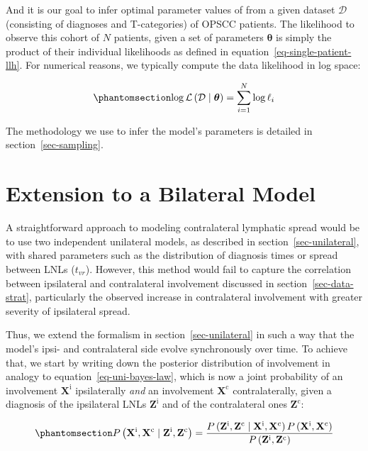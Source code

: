 \documentclass[
  sn-mathphys-num,
]{sn-jnl}
\begin{document}
And it is our goal to infer optimal parameter values of from a given
dataset \(\mathcal{D}\) (consisting of diagnoses and T-categories) of
OPSCC patients. The likelihood to observe this cohort of \(N\) patients,
given a set of parameters \(\boldsymbol{\theta}\) is simply the product
of their individual likelihoods as defined in
equation~\ref{eq-single-patient-llh}. For numerical reasons, we
typically compute the data likelihood in log space:

\begin{equation}\phantomsection\label{eq-log-likelihood}{
\log \mathcal{L} \left( \mathcal{D} \mid \boldsymbol{\theta} \right) = \sum_{i=1}^N \log \ell_i
}\end{equation}

The methodology we use to infer the model's parameters is detailed in
section~\ref{sec-sampling}.

\section{Extension to a Bilateral Model}\label{sec-ext-to-contra}

A straightforward approach to modeling contralateral lymphatic spread
would be to use two independent unilateral models, as described in
section~\ref{sec-unilateral}, with shared parameters such as the
distribution of diagnosis times or spread between LNLs (\(t_{vr}\)).
However, this method would fail to capture the correlation between
ipsilateral and contralateral involvement discussed in
section~\ref{sec-data-strat}, particularly the observed increase in
contralateral involvement with greater severity of ipsilateral spread.

Thus, we extend the formalism in section~\ref{sec-unilateral} in such a
way that the model's ipsi- and contralateral side evolve synchronously
over time. To achieve that, we start by writing down the posterior
distribution of involvement in analogy to
equation~\ref{eq-uni-bayes-law}, which is now a joint probability of an
involvement \(\mathbf{X}^\text{i}\) ipsilaterally \emph{and} an
involvement \(\mathbf{X}^\text{c}\) contralaterally, given a diagnosis
of the ipsilateral LNLs \(\mathbf{Z}^\text{i}\) and of the contralateral
ones \(\mathbf{Z}^\text{c}\):

\begin{equation}\phantomsection\label{eq-bilateral-bayes}{
P \left( \mathbf{X}^\text{i}, \mathbf{X}^\text{c} \mid \mathbf{Z}^\text{i}, \mathbf{Z}^\text{c} \right) = \frac{P \left( \mathbf{Z}^\text{i}, \mathbf{Z}^\text{c} \mid \mathbf{X}^\text{i}, \mathbf{X}^\text{c} \right) P \left( \mathbf{X}^\text{i}, \mathbf{X}^\text{c} \right)}{P \left( \mathbf{Z}^\text{i}, \mathbf{Z}^\text{c} \right)}
}\end{equation}
\end{document}
